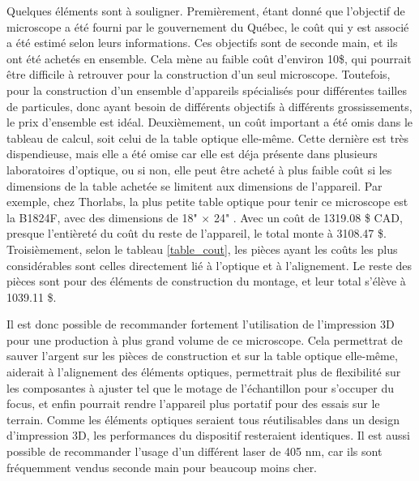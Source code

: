 \documentclass[11pt,letterpaper]{article}
\begin{document}
Quelques éléments sont à souligner. Premièrement, étant donné que l'objectif de microscope a
été fourni par le gouvernement du Québec, le coût qui y est associé a été estimé selon leurs
informations. Ces objectifs sont de seconde main, et ils ont été achetés en ensemble. Cela mène
au faible coût d'environ 10\$, qui pourrait être difficile à retrouver pour la construction d'un
seul microscope. Toutefois, pour la construction d'un ensemble d'appareils spécialisés pour
différentes tailles de particules, donc ayant besoin de différents objectifs à différents 
grossissements, le prix d'ensemble est idéal. Deuxièmement, un coût important a été omis dans 
le tableau de calcul, soit celui de la table optique elle-même. Cette dernière est très
dispendieuse, mais elle a été omise car elle est déja présente dans plusieurs laboratoires 
d'optique, ou si non, elle peut être acheté à plus faible coût si les dimensions de la table
achetée se limitent aux dimensions de l'appareil. Par exemple, chez Thorlabs, la plus petite 
table optique pour tenir ce microscope est la B1824F, avec des dimensions de 18" $\times$ 24" \cite{noauthor_thorlabs_2024}.
Avec un coût de 1319.08 \$ CAD, presque l'entièreté du coût du reste de l'appareil, le total
monte à 3108.47 \$. Troisièmement, selon le tableau \ref{table_cout}, les pièces ayant les
coûts les plus considérables sont celles directement lié à l'optique et à l'alignement. Le
reste des pièces sont pour des éléments de construction du montage, et leur total s'élève à
1039.11 \$.

Il est donc possible de recommander fortement l'utilisation de l'impression 3D pour une production
à plus grand volume de ce microscope. Cela permettrat de sauver l'argent sur les pièces de
construction et sur la table optique elle-même, aiderait à l'alignement des éléments optiques,
permettrait plus de flexibilité sur les composantes à ajuster tel que le motage de l'échantillon pour
s'occuper du focus, et enfin pourrait rendre l'appareil plus portatif pour des essais sur le terrain.
Comme les éléments optiques seraient tous réutilisables dans un design d'impression 3D, les
performances du dispositif resteraient identiques. Il est aussi possible de recommander l'usage
d'un différent laser de 405 nm, car ils sont fréquemment vendus seconde main pour beaucoup moins
cher.



\end{document}
